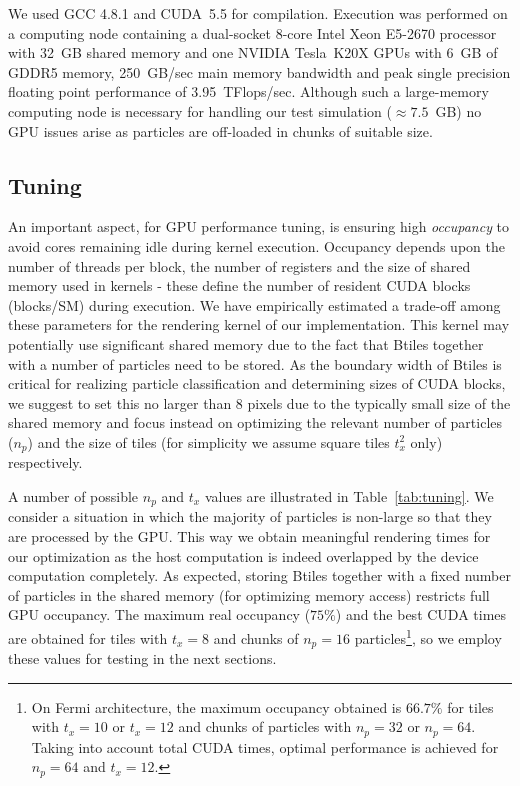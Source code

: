 \documentclass[preprint,5pt]{elsarticle}
\begin{document}
We used GCC 4.8.1 and CUDA~5.5 for compilation. Execution was performed on a computing node containing a dual-socket 8-core Intel Xeon E5-2670 processor with 32~GB shared memory and one NVIDIA Tesla~K20X GPUs with 6~GB of GDDR5 memory, 250~GB/sec main memory bandwidth and peak single precision floating point performance of 3.95~TFlops/sec. Although such a large-memory computing node is necessary for handling our test simulation ($\approx 7.5$~GB) no GPU issues arise as particles are off-loaded in chunks of suitable size. 

\subsection{Tuning}
\label{sec:gpuperf}
An important aspect, for GPU performance tuning, is ensuring high {\it occupancy} to avoid cores remaining idle during kernel execution. Occupancy depends upon the number of threads per block, the number of registers and the size of shared memory used in kernels - these define the number of resident CUDA blocks (blocks/SM) during execution. We have empirically estimated a trade-off among these parameters for the rendering kernel of our implementation. This kernel may potentially use significant shared memory due to the fact that Btiles together with a number of particles need to be stored. As the boundary width of Btiles is critical for realizing particle classification and determining sizes of CUDA blocks, we suggest to set this no larger than 8 pixels due to the typically small size of the shared memory and focus instead on optimizing the relevant number of particles ($n_p$) and the size of tiles (for simplicity we assume square tiles $t_x^2$ only) respectively.

A number of possible $n_p$ and $t_x$ values are illustrated in Table~\ref{tab:tuning}. We consider a situation in which the majority of particles is non-large so that they are processed by the GPU. This way we obtain meaningful rendering times for our optimization as the host computation is indeed overlapped by the device computation completely. As expected, storing Btiles together with a fixed number of particles in the shared memory (for optimizing memory access) restricts full GPU occupancy. The maximum real occupancy ($75\%$) and the best CUDA times are obtained for tiles with $t_x = 8$ and chunks of  $n_p = 16$ particles\footnote{On Fermi architecture, the maximum occupancy obtained is $66.7\%$ for tiles with $t_x = 10$ or $t_x = 12$ and chunks of particles with $n_p = 32$ or $n_p=64$. Taking into account total CUDA times, optimal performance is achieved for $n_p=64$ and $t_x = 12$.}, so we employ these values for testing in the next sections.
\end{document}
